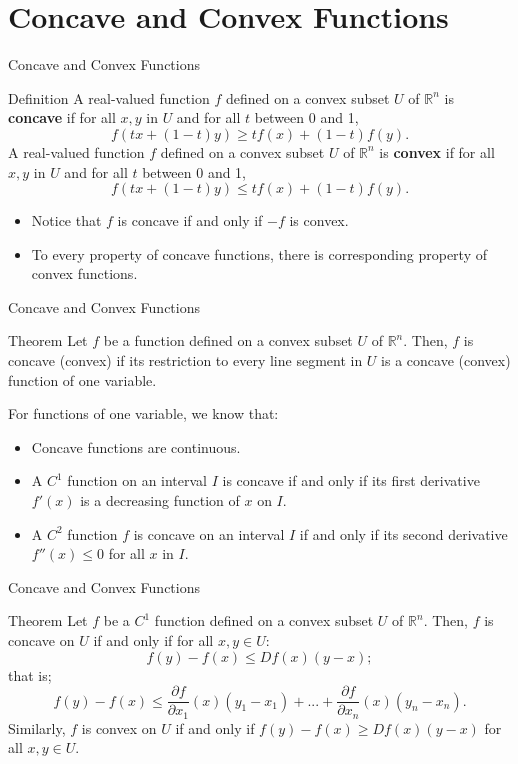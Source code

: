 \documentclass{beamer}
\begin{document}
\section{Concave and Convex Functions}
\begin{frame}{Concave and Convex Functions}
    \begin{block}{Definition}
    A real-valued function $f$ defined on a convex subset $U$ of $\mathbb{R}^n$ is \textbf{concave} if for all $x, y$ in $U$ and for all $t$ between 0 and 1, 
    \[f(tx+(1-t)y)\geq tf(x)+(1-t)f(y).
    \]
      A real-valued function $f$ defined on a convex subset $U$ of $\mathbb{R}^n$ is \textbf{convex} if for all $x, y$ in $U$ and for all $t$ between 0 and 1, 
    \[f(tx+(1-t)y)\leq tf(x)+(1-t)f(y).
    \]
    \end{block}
    
    \begin{itemize}
        \item Notice that  $f$ is concave if and only if $-f$ is convex. 
        \item To every property of concave functions, there is corresponding property of convex functions. 
        
    \end{itemize}
    \end{frame}

\begin{frame}{Concave and Convex Functions}

\begin{block}{Theorem}
Let $f$ be a function defined on a convex subset $U$ of $\mathbb{R}^n$. Then, $f$ is concave (convex) if its restriction to every line segment in $U$ is a concave (convex) function of one variable. 

\end{block}
For functions of one variable, we know that:
\begin{itemize}
\item Concave functions are continuous. 
    \item A $C^1$ function on an interval $I$ is concave if and only if its first derivative $f'(x)$ is a decreasing function of $x$ on $I$. 
    \item A $C^2$ function $f$ is concave on an interval $I$ if and only if its second derivative $f''(x)\leq 0$ for all $x$ in $I$.
\end{itemize}
   \end{frame}

\begin{frame}{Concave and Convex Functions}

\begin{block}{Theorem}
Let $f$ be a $C^1$ function defined on a convex subset $U$ of $\mathbb{R}^n$. Then, $f$ is concave on $U$ if and only if for all $x, y\in U$:
\[f(y)-f(x)\leq Df(x)(y-x);
\]
that is;
\[f(y)-f(x)\leq \frac{\partial f }{\partial x_1}(x) (y_1-x_1)+...+\frac{\partial f}{\partial x_n}(x)(y_n-x_n).
\]
Similarly,  $f$ is convex on $U$ if and only if $f(y)-f(x)\geq Df(x) (y-x)$ for all $x, y\in U$.
\end{block}
  \end{frame}
\end{document}
